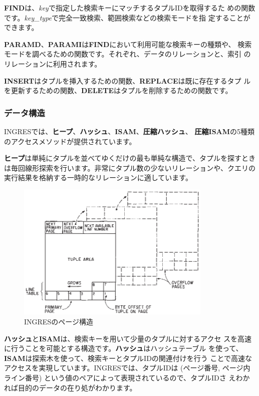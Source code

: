 {\bf FIND}は、{\it key}で指定した検索キーにマッチするタプルIDを取得するた
めの関数です。{\it key\_type}で完全一致検索、範囲検索などの検索モードを指
定することができます。


{\bf PARAMD}、{\bf PARAMI}は{\bf FIND}において利用可能な検索キーの種類や、
検索モードを調べるための関数です。それぞれ、データのリレーションと、索引
のリレーションに利用されます。


{\bf INSERT}はタプルを挿入するための関数、{\bf REPLACE}は既に存在するタプ
ルを更新するための関数、{\bf DELETE}はタプルを削除するための関数です。


\subsubsection{データ構造}


INGRESでは、{\bf ヒープ}、{\bf ハッシュ}、{\bf ISAM}、{\bf 圧縮ハッシュ}、
{\bf 圧縮ISAM}の5種類のアクセスメソッドが提供されています。


{\bf ヒープ}は単純にタプルを並べてゆくだけの最も単純な構造で、タプルを探すとき
は毎回線形探索を行います。非常にタプル数の少ないリレーションや、クエリの
実行結果を格納する一時的なリレーションに適しています。


\begin{figure}[tb]
 \begin{center}
  \includegraphics[height=66mm]{hayamiz/images/page-layout-ingres.eps}
  \caption{INGRESのページ構造}
  \label{174456_16Jul12}
 \end{center}
\end{figure}


{\bf ハッシュ}と{\bf ISAM}は、検索キーを用いて少量のタプルに対するアクセ
スを高速に行うことを可能とする構造です。{\bf ハッシュ}はハッシュテーブル
を使って、{\bf ISAM}は探索木を使って、検索キーとタプルIDの関連付けを行う
ことで高速なアクセスを実現しています。INGRESでは、タプルIDは (ページ番号,
ページ内ライン番号) という値のペアによって表現されているので、タプルIDさ
えわかれば目的のデータの在り処がわかります。


